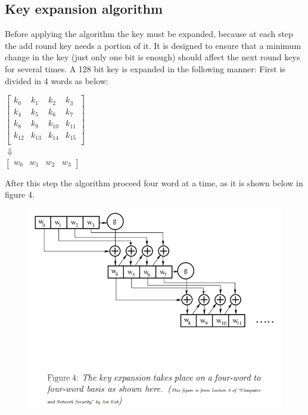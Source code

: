 \subsection{Key expansion algorithm}

Before applying the algorithm the key must be expanded, because at each step the add round key needs a portion of it. It is designed to ensure that a minimum change in the key (just only one bit is enough) should affect the next round keys for several times. A 128 bit key is expanded in the following manner: 
First is divided in 4 words as below:
\newpage

\begin{center}
$\begin{bmatrix}
k_0 & k_1 & k_2 & k_3\\
k_4 & k_5 & k_6 & k_7\\
k_8 & k_9 & k_10 & k_11\\
k_12 & k_13 & k_14 & k_15\\
\end{bmatrix}$\\
$\Downarrow$\\
$
\begin{bmatrix}
w_0 & w_1 & w_2 & w_3
\end{bmatrix}$\\
\end{center}
After this step the algorithm proceed four word at a time, as it is shown below in figure 4.\\
\begin{figure}[htbp]
	\centering
	\includegraphics[scale=0.7]{key_expansion.png}
\end{figure}
